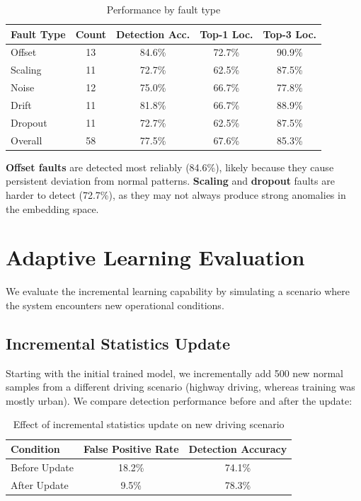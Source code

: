 \begin{table}[htbp]
\centering
\caption{Performance by fault type}
\label{tab:per_fault_type}
\begin{tabular}{@{}lcccc@{}}
\toprule
Fault Type & Count & Detection Acc. & Top-1 Loc. & Top-3 Loc. \\
\midrule
Offset & 13 & 84.6\% & 72.7\% & 90.9\% \\
Scaling & 11 & 72.7\% & 62.5\% & 87.5\% \\
Noise & 12 & 75.0\% & 66.7\% & 77.8\% \\
Drift & 11 & 81.8\% & 66.7\% & 88.9\% \\
Dropout & 11 & 72.7\% & 62.5\% & 87.5\% \\
\midrule
Overall & 58 & 77.5\% & 67.6\% & 85.3\% \\
\bottomrule
\end{tabular}
\end{table}

\textbf{Offset faults} are detected most reliably (84.6\%), likely because they cause persistent deviation from normal patterns. \textbf{Scaling} and \textbf{dropout} faults are harder to detect (72.7\%), as they may not always produce strong anomalies in the embedding space.

\section{Adaptive Learning Evaluation}

We evaluate the incremental learning capability by simulating a scenario where the system encounters new operational conditions.

\subsection{Incremental Statistics Update}

Starting with the initial trained model, we incrementally add 500 new normal samples from a different driving scenario (highway driving, whereas training was mostly urban). We compare detection performance before and after the update:

\begin{table}[htbp]
\centering
\caption{Effect of incremental statistics update on new driving scenario}
\label{tab:incremental_stats}
\begin{tabular}{@{}lcc@{}}
\toprule
Condition & False Positive Rate & Detection Accuracy \\
\midrule
Before Update & 18.2\% & 74.1\% \\
After Update & 9.5\% & 78.3\% \\
\bottomrule
\end{tabular}
\end{table}

